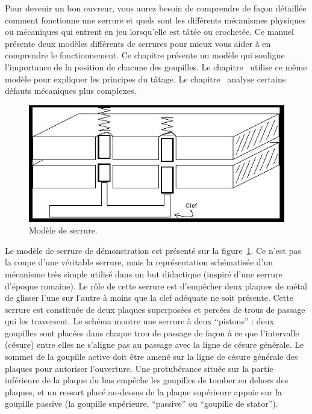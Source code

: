 \documentclass[a4paper,french,11pt,twoside]{report}
\begin{document}
Pour devenir un bon ouvreur, vous aurez besoin de comprendre de façon détaillée comment fonctionne une serrure et quels sont les différents mécanismes physiques ou mécaniques qui entrent en jeu lorsqu'elle est tâtée ou crochetée. Ce manuel présente deux modèles différents de serrures pour mieux vous aider à en comprendre le fonctionnement. Ce chapitre présente un modèle qui souligne l'importance de la position de chacune des goupilles. Le chapitre~ utilise ce même modèle pour expliquer les principes du tâtage. Le chapitre~ analyse certains défauts mécaniques plus complexes.


\begin{figure}[h]
  \begin{center}
    \includegraphics[width=16cm]{images/image3_serrure.png}
    \caption{Modèle de serrure.\label{modele_serrure}}
  \end{center}
\end{figure}


Le modèle de serrure de démonstration est présenté sur la figure~\ref{modele_serrure}. Ce n'est pas la coupe d'une véritable serrure, mais la représentation schématisée d'un mécanisme très simple utilisé dans un but didactique (inspiré d'une serrure d'époque romaine). Le rôle de cette serrure est d'empêcher deux plaques de métal de glisser l'une sur l'autre à moins que la clef adéquate ne soit présente. Cette serrure est constituée de deux plaques superposées et percées de trous de passage qui les traversent. Le schéma montre une serrure à deux \enquote{pistons} : deux goupilles sont placées dans chaque trou de passage de façon à ce que l'intervalle (césure) entre elles ne s'aligne pas au passage avec la ligne de césure générale. Le sommet de la goupille active doit être amené sur la ligne de césure générale des plaques pour autoriser l'ouverture. Une protubérance située sur la partie inférieure de la plaque du bas empêche les goupilles de tomber en dehors des plaques, et un ressort placé au-dessus de la plaque supérieure appuie sur la goupille passive (la goupille supérieure, \enquote{passive} ou \enquote{goupille de stator}).
\end{document}
